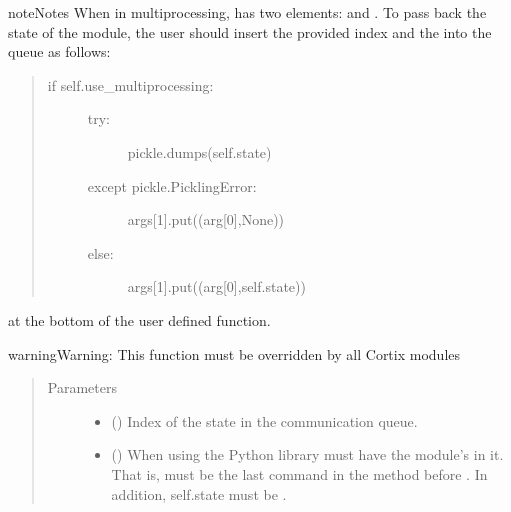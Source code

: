 \documentclass[letterpaper,10pt,openany,oneside,english]{sphinxmanual}
\begin{document}
\begin{fulllineitems}
\begin{fulllineitems}
\begin{sphinxadmonition}{note}{Notes}
When in multiprocessing,  has two elements:  and .
To pass back the state of the module, the user should insert the provided
index  and the  into the queue as follows:
\begin{quote}
\begin{description}
\item[{if self.use\_multiprocessing:}] \leavevmode\begin{description}
\item[{try:}] \leavevmode
pickle.dumps(self.state)

\item[{except pickle.PicklingError:}] \leavevmode
args{[}1{]}.put((arg{[}0{]},None))

\item[{else:}] \leavevmode
args{[}1{]}.put((arg{[}0{]},self.state))

\end{description}

\end{description}
\end{quote}

at the bottom of the user defined  function.
\end{sphinxadmonition}

\begin{sphinxadmonition}{warning}{Warning:}
This function must be overridden by all Cortix modules
\end{sphinxadmonition}
\begin{quote}\begin{description}
\item[{Parameters}] \leavevmode\begin{itemize}
\item {} 
\sphinxstyleliteralstrong{\sphinxupquote{{[}}}\sphinxstyleliteralstrong{\sphinxupquote{{]}}} () \textendash{} Index of the state in the communication queue.

\item {} 
\sphinxstyleliteralstrong{\sphinxupquote{{[}}}\sphinxstyleliteralstrong{\sphinxupquote{{]}}} () \textendash{} When using the Python  library  must have
the module’s  in it. That is,
 must be the last command in the
method before . In addition, self.state must be .


\end{itemize}
\end{description}
\end{quote}
\end{fulllineitems}
\end{fulllineitems}
\end{document}
